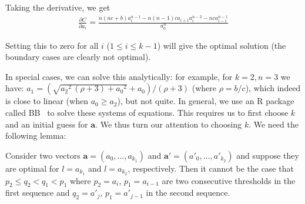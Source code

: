 Taking the derivative, we get
\begin{align}
 \frac{\partial C}{\partial a_i} = \frac{
	n(nc+b)a_i^{n-1}-n(n-1)ca_{i+1}a_i^{n-2}-nca_{i-1}^{n-1} }{a_0^n}
	\label{eq:diff_C_general}
\end{align}

Setting this to zero for all $i$ ($1 \leq i \leq k-1$) will give the
optimal solution (the boundary cases are clearly not optimal).

In special cases, we can solve this analytically: for example, 
for $k =
2, n = 3$ we have: $a_1 =
(\sqrt{{a_2}^{2}\,(\rho+3)+{a_0}^{2}}+a_0)/(\rho+3)$ (where $\rho=b/c$), which
indeed is close to linear (when $a_0 \geq a_2$), but not quite.
In general, we use 
an R package called BB~\cite{Varadhan2009:BB} to
solve these systems of equations. 
This requires us to 
 first choose $k$ and an initial guess for $\boldsymbol a$.
We thus turn our attention to choosing $k$.  We need the following lemma:


\begin{lemma}\label{lemma:thresholds}
Consider two vectors $\boldsymbol a = (a_0, \ldots, a_{k_1})$ and
$\boldsymbol a' = (a'_0, \ldots, a'_{k_2})$ and suppose they are optimal
for $l=a_{k_1}$ and $l=a_{k_2}$, respectively.  Then it cannot be the case
that  $p_2 \leq q_2 < q_1 < p_1$
where $p_2 = a_i$, $p_1= a_{i-1}$ are two consecutive thresholds in the
first sequence and  $q_2 = a'_j$, $p_1= a'_{j-1}$ in the second sequence.
\end{lemma}

